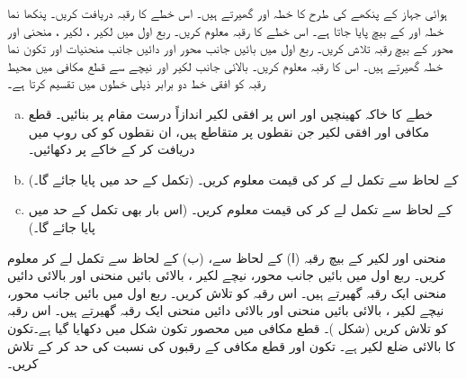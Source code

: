 ہوائی جہاز کے پنکھے کی طرح کا خطہ  اور  گھیرتے ہیں۔ اس خطے کا رقبہ دریافت کریں۔
پنکھا نما خطہ  اور  کے بیچ پایا جاتا ہے۔ اس خطے کا رقبہ معلوم کریں۔
ربع اول میں لکیر ، لکیر ، منحنی  اور   محور کے بیچ رقبہ تلاش کریں۔
ربع اول میں بائیں جانب  محور اور دائیں جانب منحنیات  اور  تکون نما خطہ گھیرتے ہیں۔ اس کا رقبہ معلوم کریں۔
بالائی جانب لکیر  اور نیچے سے قطع مکافی   میں محیط رقبہ کو افقی خط  دو برابر ذیلی خطوں میں تقسیم کرتا ہے۔
\begin{enumerate}[a.]
\item
خطے کا خاکہ کھینچیں اور اس پر افقی لکیر  اندازاً درست مقام پر بنائیں۔ قطع مکافی اور افقی لکیر جن نقطوں پر متقاطع ہیں، ان نقطوں کو  کی روپ میں دریافت کر کے خاکے پر دکھائیں۔
\item
{} کے لحاظ سے تکمل لے کر  کی قیمت معلوم کریں۔ (تکمل کے حد میں  پایا جائے گا۔)
\item
{} کے لحاظ سے تکمل لے کر  کی قیمت معلوم کریں۔ (اس بار بھی تکمل کے حد میں  پایا جائے گا۔)
\end{enumerate}
منحنی  اور لکیر  کے بیچ رقبہ (ا)  کے لحاظ سے، (ب)  کے لحاظ سے تکمل لے کر معلوم کریں۔
ربع اول میں بائیں جانب  محور، نیچے لکیر ، بالائی بائیں منحنی  اور بالائی دائیں منحنی  ایک رقبہ گھیرتے ہیں۔ اس رقبہ کو تلاش کریں۔
ربع اول میں بائیں جانب  محور، نیچے لکیر ، بالائی بائیں منحنی  اور بالائی دائیں
 منحنی  ایک رقبہ گھیرتے ہیں۔ اس رقبہ کو تلاش کریں (شکل )۔
قطع مکافی  میں محصور تکون  شکل  میں دکھایا گیا ہے۔تکون کا بالائی ضلع لکیر  ہے۔ تکون اور قطع مکافی کے رقبوں کی  نسبت کی حد  کر کے  تلاش کریں۔
